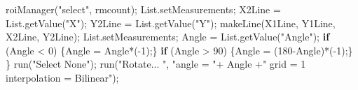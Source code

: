 \documentclass[10pt, b5paper, singlespacinge, twoside]{reedthesis} %
\newenvironment{Shaded}{}{}
\newcommand{\ControlFlowTok}[1]{\textbf{#1}}
\newcommand{\DecValTok}[1]{#1}
\newcommand{\FunctionTok}[1]{#1}
\newcommand{\NormalTok}[1]{#1}
\newcommand{\OtherTok}[1]{#1}
\newcommand{\SpecialCharTok}[1]{#1}
\newcommand{\StringTok}[1]{#1}
\theoremstyle{definition}
\theoremstyle{definition}
\theoremstyle{definition}
\theoremstyle{remark}
\begin{document}
\begin{Shaded}
\begin{Highlighting}[numbers=left,,]
        \FunctionTok{roiManager}\NormalTok{(}\StringTok{"select"}\NormalTok{, rmcount);}
\NormalTok{        List.setMeasurements;}
\NormalTok{        X2Line }\OtherTok{=} \FunctionTok{List.getValue}\NormalTok{(}\StringTok{"X"}\NormalTok{);}
\NormalTok{        Y2Line }\OtherTok{=} \FunctionTok{List.getValue}\NormalTok{(}\StringTok{"Y"}\NormalTok{);}
        \FunctionTok{makeLine}\NormalTok{(X1Line, Y1Line, X2Line, Y2Line); }
\NormalTok{        List.setMeasurements;}
\NormalTok{        Angle }\OtherTok{=} \FunctionTok{List.getValue}\NormalTok{(}\StringTok{"Angle"}\NormalTok{);}
        \ControlFlowTok{if}\NormalTok{ (Angle }\SpecialCharTok{\textless{}} \DecValTok{0}\NormalTok{) \{Angle }\OtherTok{=}\NormalTok{ Angle}\SpecialCharTok{*}\NormalTok{(}\SpecialCharTok{{-}}\DecValTok{1}\NormalTok{);\}}
        \ControlFlowTok{if}\NormalTok{ (Angle }\SpecialCharTok{\textgreater{}} \DecValTok{90}\NormalTok{) \{Angle }\OtherTok{=}\NormalTok{ (}\DecValTok{180}\SpecialCharTok{{-}}\NormalTok{Angle)}\SpecialCharTok{*}\NormalTok{(}\SpecialCharTok{{-}}\DecValTok{1}\NormalTok{);\}}
\NormalTok{    \}}
    \FunctionTok{run}\NormalTok{(}\StringTok{"Select None"}\NormalTok{);}
    \FunctionTok{run}\NormalTok{(}\StringTok{"Rotate... "}\NormalTok{, }\StringTok{"angle = "}\SpecialCharTok{+}\NormalTok{ Angle }\SpecialCharTok{+}\StringTok{" grid = 1 interpolation = Bilinear"}\NormalTok{);}
    

\end{Highlighting}
\end{Shaded}
\end{document}
